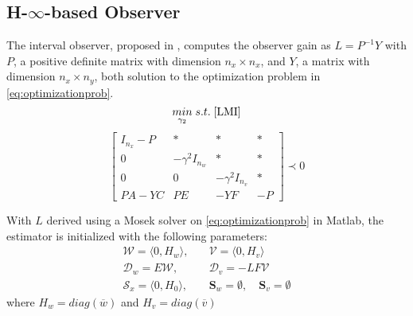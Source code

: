 \subsection{H-$\infty$-based Observer}
The interval observer, proposed in \cite{Tang2019}, computes the observer gain as $L= P^{-1}Y$ with $P$, a positive definite matrix with dimension $n_x \times n_x$, and $Y$, a matrix with dimension $n_x \times n_y$, both solution to the optimization problem in \eqref{eq:optimizationprob}.
\begin{equation}
\label{eq:optimizationprob}
\underset{\gamma _2}{min} \;
s.t. \; \eqref{LMI}
\end{equation} 
\begin{equation}
\label{LMI}
\left[\begin{matrix}
I_{n_x} -P & * & * & *\\
0 & -\gamma ^2 I_{n_w} & * &* \\
0 & 0 & -\gamma ^2 I_{n_v} & *\\
PA-YC & PE & -YF & -P
\end{matrix}\right]  \prec 0
\end{equation} 

With $L$ derived using a Mosek solver on \eqref{eq:optimizationprob} in Matlab\textsuperscript{\tiny\textregistered}, the estimator is initialized with the following parameters:\\
\begin{equation}
\begin{split}
\mathcal{W} = \langle 0, H_w\rangle,& \quad \mathcal{V} = \langle 0,H_v\rangle\\
\mathcal{D}_w = E\mathcal{W}, & \quad \mathcal{D}_v = -LF\mathcal{V}\\
\mathcal{S}_x= \langle 0, H_0\rangle, &\quad \textbf{S}_w = \emptyset,\quad \textbf{S}_v = \emptyset
\end{split}
\end{equation}
where $H_w = diag(\overline{w})$ and $H_v= diag(\overline{v})$

